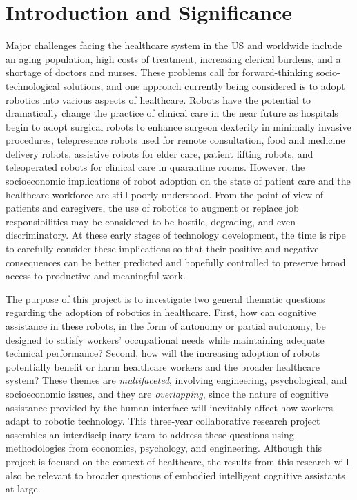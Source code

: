 
\section{Introduction and Significance}\label{sec:intro}

Major challenges facing the healthcare system in the US and worldwide include an aging population, high costs of treatment, increasing clerical burdens, and a shortage of doctors and nurses. These problems call for forward-thinking socio-technological solutions, and one approach currently being considered is to adopt robotics into various aspects of healthcare.  Robots have the potential to dramatically change the practice of clinical care in the near future as hospitals begin to adopt surgical robots to enhance surgeon dexterity in minimally invasive procedures, telepresence robots used for remote consultation, food and medicine delivery robots, assistive robots for elder care, patient lifting robots, and teleoperated robots for clinical care in quarantine rooms.  However, the socioeconomic implications of robot adoption on the state of patient care and the healthcare workforce are still poorly understood.  From the point of view of patients and caregivers, the use of robotics to augment or replace job responsibilities may be considered to be hostile, degrading, and even discriminatory. At these early stages of technology development, the time is ripe to carefully consider these implications so that their positive and negative consequences can be better predicted and hopefully controlled to preserve broad access to productive and meaningful work.

The purpose of this project is to investigate two general thematic questions regarding the adoption of robotics in healthcare.  First, how can cognitive assistance in these robots, in the form of autonomy or partial autonomy, be designed to satisfy workers' occupational needs while maintaining adequate technical performance?   Second, how will the increasing adoption of robots  potentially benefit or harm healthcare workers and the broader healthcare system?   These themes are {\em multifaceted}, involving engineering, psychological, and socioeconomic issues, and they are {\em overlapping}, since the nature of cognitive assistance provided by the human interface will inevitably affect how workers adapt to robotic technology.  This three-year collaborative research project assembles an interdisciplinary team to address these questions using methodologies from economics, psychology, and engineering.  Although this project is focused on the context of healthcare, the results from this research will also be relevant to broader questions of embodied intelligent cognitive assistants at large.

